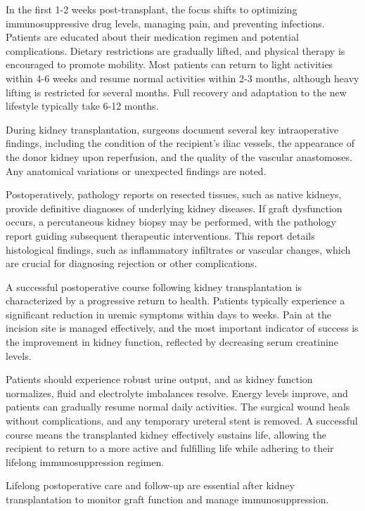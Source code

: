 In the first 1-2 weeks post-transplant, the focus shifts to optimizing immunosuppressive drug levels, managing pain, and preventing infections. Patients are educated about their medication regimen and potential complications. Dietary restrictions are gradually lifted, and physical therapy is encouraged to promote mobility. Most patients can return to light activities within 4-6 weeks and resume normal activities within 2-3 months, although heavy lifting is restricted for several months. Full recovery and adaptation to the new lifestyle typically take 6-12 months.

During kidney transplantation, surgeons document several key intraoperative findings, including the condition of the recipient's iliac vessels, the appearance of the donor kidney upon reperfusion, and the quality of the vascular anastomoses. Any anatomical variations or unexpected findings are noted.

Postoperatively, pathology reports on resected tissues, such as native kidneys, provide definitive diagnoses of underlying kidney diseases. If graft dysfunction occurs, a percutaneous kidney biopsy may be performed, with the pathology report guiding subsequent therapeutic interventions. This report details histological findings, such as inflammatory infiltrates or vascular changes, which are crucial for diagnosing rejection or other complications.

A successful postoperative course following kidney transplantation is characterized by a progressive return to health. Patients typically experience a significant reduction in uremic symptoms within days to weeks. Pain at the incision site is managed effectively, and the most important indicator of success is the improvement in kidney function, reflected by decreasing serum creatinine levels.

Patients should experience robust urine output, and as kidney function normalizes, fluid and electrolyte imbalances resolve. Energy levels improve, and patients can gradually resume normal daily activities. The surgical wound heals without complications, and any temporary ureteral stent is removed. A successful course means the transplanted kidney effectively sustains life, allowing the recipient to return to a more active and fulfilling life while adhering to their lifelong immunosuppression regimen.

Lifelong postoperative care and follow-up are essential after kidney transplantation to monitor graft function and manage immunosuppression. 

